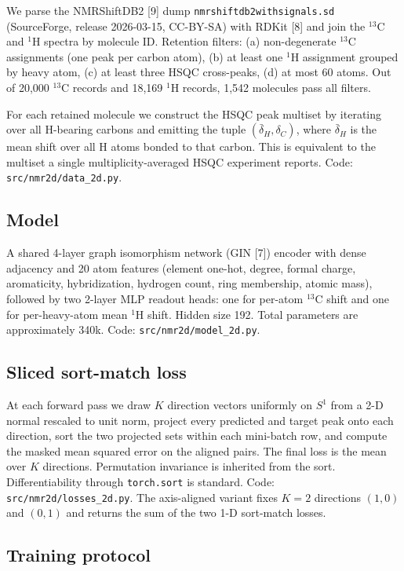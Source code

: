 \documentclass[
  11pt,
  a4paper,
]{article}
\begin{document}
We parse the NMRShiftDB2 {[}9{]} dump \texttt{nmrshiftdb2withsignals.sd}
(SourceForge, release 2026-03-15, CC-BY-SA) with RDKit {[}8{]} and join the
\(^{13}\)C and \(^{1}\)H spectra by
molecule ID. Retention filters: (a) non-degenerate \(^{13}\)C assignments
(one peak per carbon atom), (b) at least one \(^{1}\)H assignment
grouped by heavy atom, (c) at least three HSQC cross-peaks, (d) at most
60 atoms. Out of 20,000 \(^{13}\)C records and 18,169 \(^{1}\)H records,
1,542 molecules pass all filters.

For each retained molecule we construct the HSQC peak multiset by
iterating over all H-bearing carbons and emitting the tuple
\((\bar{\delta}_{H}, \delta_{C})\), where
\(\bar{\delta}_{H}\) is the mean shift over all H atoms bonded to that
carbon. This is equivalent to the multiset a single
multiplicity-averaged HSQC experiment reports. Code:
\texttt{src/nmr2d/data\_2d.py}.

\subsection*{Model}

A shared 4-layer graph isomorphism network (GIN {[}7{]}) encoder with dense
adjacency and 20 atom features (element one-hot, degree, formal
charge, aromaticity, hybridization, hydrogen count, ring membership,
atomic mass), followed by two 2-layer MLP readout heads: one for
per-atom \(^{13}\)C shift and one for per-heavy-atom mean \(^{1}\)H shift.
Hidden size 192. Total parameters are approximately 340k. Code:
\texttt{src/nmr2d/model\_2d.py}.

\subsection*{Sliced sort-match loss}

At each forward pass we draw \(K\) direction vectors uniformly on \(S^{1}\)
from a 2-D normal rescaled to unit norm, project every predicted and
target peak onto each direction, sort the two projected sets within
each mini-batch row, and compute the masked mean squared error on the
aligned pairs. The final loss is the mean over \(K\) directions.
Permutation invariance is inherited from the sort. Differentiability
through \texttt{torch.sort} is standard. Code: \texttt{src/nmr2d/losses\_2d.py}. The
axis-aligned variant fixes \(K=2\) directions \((1,0)\) and \((0,1)\) and
returns the sum of the two 1-D sort-match losses.

\subsection*{Training protocol}
\end{document}
